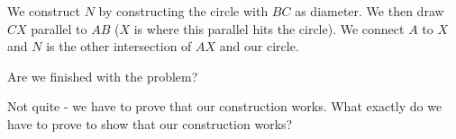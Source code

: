 


We construct $N$ by constructing the circle with $BC$ as diameter. We then draw $CX$ parallel to $AB$ ($X$ is where this parallel hits the circle). We connect $A$ to $X$ and $N$ is the other intersection of $AX$ and our circle.

Are we finished with the problem?









Not quite - we have to prove that our construction works. What exactly do we have to prove to show that our construction works?

